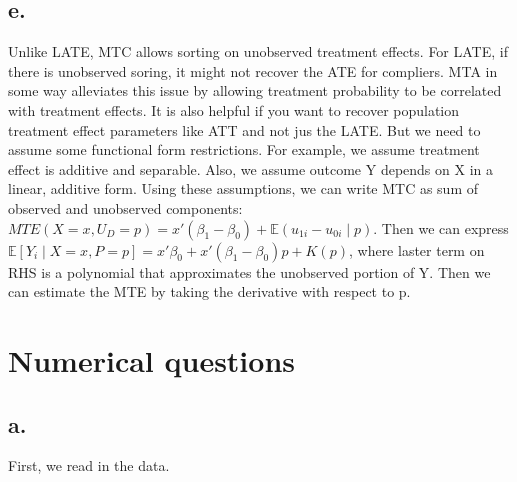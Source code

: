 \documentclass[
  letterpaper,
  DIV=11,
  numbers=noendperiod]{scrartcl}
\begin{document}
\subsection{e.}\label{e.}

Unlike LATE, MTC allows sorting on unobserved treatment effects. For
LATE, if there is unobserved soring, it might not recover the ATE for
compliers. MTA in some way alleviates this issue by allowing treatment
probability to be correlated with treatment effects. It is also helpful
if you want to recover population treatment effect parameters like ATT
and not jus the LATE. But we need to assume some functional form
restrictions. For example, we assume treatment effect is additive and
separable. Also, we assume outcome Y depends on X in a linear, additive
form. Using these assumptions, we can write MTC as sum of observed and
unobserved components:
\(MTE(X=x, U_D = p) = x'(\beta_1 - \beta_0) + \mathbb{E}(u_{1i} - u_{0i} \mid p)\).
Then we can express
\(\mathbb{E}[Y_i \mid X = x, P = p] = x' \beta_0 + x' (\beta_1 - \beta_0)p + K(p)\),
where laster term on RHS is a polynomial that approximates the
unobserved portion of Y. Then we can estimate the MTE by taking the
derivative with respect to p.

\section{Numerical questions}\label{numerical-questions}

\subsection{a.}\label{a.-1}

First, we read in the data.
\end{document}
